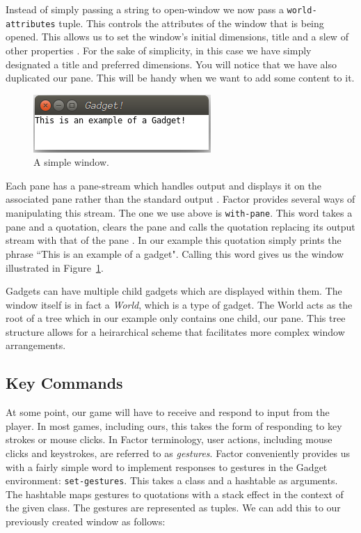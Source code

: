 \documentclass{sig-alternate}
\begin{document}
Instead of simply passing a string to open-window we now pass a \texttt{world-attributes} tuple. This controls the attributes of the window that is being opened. This allows us to set the window's initial dimensions, title and a slew of other properties \cite{world}.   For the sake of simplicity, in this case we have simply designated a title and preferred dimensions.  You will notice that we have also duplicated our pane. This will be handy when we want to add some content to it.

\begin{figure}[h!]
  \centering
    \includegraphics[scale=.7]{Gadget.png}
  \caption{A simple window.}
  \label{fig:gadget}
\end{figure}

Each pane has a pane-stream which handles output and displays it on the associated pane rather than the standard output \cite{Pane}. Factor provides several ways of manipulating this stream. The one we use above is \texttt{with-pane}. This word takes a pane and a quotation, clears the pane and calls the quotation replacing its output stream with that of the pane \cite{withpane}. In our example this quotation simply prints the phrase ``This is an example of a gadget".  Calling this word gives us the window illustrated in Figure~\ref{fig:gadget}.

Gadgets can have multiple child gadgets which are displayed within them. The window itself is in fact a \textit{World}, which is a type of gadget. The World acts as the root of a tree which in our example only contains one child, our pane. This tree structure allows for a heirarchical scheme that facilitates more complex window arrangements.

\subsection{Key Commands}

At some point, our game will have to receive and respond to input from the player. In most games, including ours, this takes the form of responding to key strokes or mouse clicks. In Factor terminology, user actions, including mouse clicks and keystrokes, are referred to as \textit{gestures}. Factor conveniently provides us with a fairly simple word to implement responses to gestures in the Gadget environment: \texttt{set-gestures}. This takes a class and a hashtable as arguments. The hashtable maps gestures to quotations with a stack effect in the context of the given class\cite{setgestures}. The gestures are represented as tuples. We can add this to our previously created window as follows:
\end{document}
